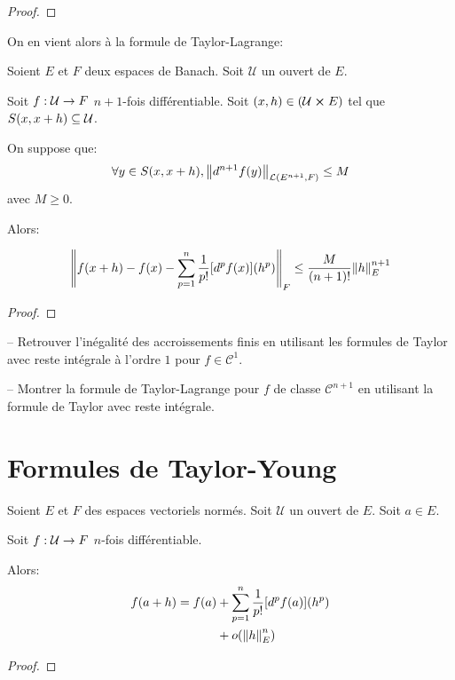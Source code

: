 \ifdefined\outputproof
\begin{proof}

\end{proof}
\fi

On en vient alors à la formule de Taylor-Lagrange:

\begin{theorem} 
	\label{theorem:taylor_lagrange_formula}
	Soient $E$ et $F$ deux espaces de Banach. Soit $\mathcal{U}$ un ouvert de
	$E$.

	Soit $f : \mathcal{U} \rightarrow F$ $n + 1$-fois différentiable.
	Soit $(x, h) \in (\mathcal{U} \cross E)$ tel que $S(x, x + h)
	\subseteq \mathcal{U}$.

	On suppose que:
	\begin{equation*}
		\forall y \in S(x, x + h), \norm{d^{n +
		1}f(y)}_{\mathcal{L}(E^{n + 1}, F)} \leq M
	\end{equation*}
	avec $M \geq 0$.

	Alors:

	\begin{equation*}
		\norm{f(x + h) - f(x) - \displaystyle \sum_{p = 1}^{n}
		\frac{1}{p!} [d^{p}f(x)](h^{p})}_{F} \leq \frac{M}{(n + 1)!}
		\norm{h}_{E}^{n + 1}
	\end{equation*}
\end{theorem}

\ifdefined\outputproof
\begin{proof}

\end{proof}
\fi

\begin{exercice}
	-- Retrouver l'inégalité des accroissements finis en utilisant les formules
	de Taylor avec reste intégrale à l'ordre $1$ pour $f \in \mathcal{C}^{1}$.

	-- Montrer la formule de Taylor-Lagrange pour $f$ de classe $\mathcal{C}^{n
	+ 1}$ en utilisant la formule de Taylor avec reste intégrale.
\end{exercice}

\section{Formules de Taylor-Young}

\begin{theorem}
	\label{theorem:taylor_young_formula}
	Soient $E$ et $F$ des espaces vectoriels normés. Soit $\mathcal{U}$ un
	ouvert de $E$. Soit $a \in E$.

	Soit $f : \mathcal{U} \rightarrow F$ $n$-fois différentiable.

	Alors:
	\begin{align*}
		f(a + h) = f(a) & + \displaystyle \sum_{p = 1}^{n} \frac{1}{p!}
		[d^{p}f(a)] (h^{p}) \\
						& + o(\norm{h}_{E}^{n})
	\end{align*}
\end{theorem}

\ifdefined\outputproof
\begin{proof}

\end{proof}
\fi

